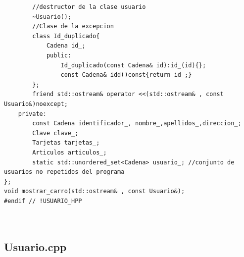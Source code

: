 \begin{verbatim}
        //destructor de la clase usuario
        ~Usuario();
        //Clase de la excepcion
        class Id_duplicado{
            Cadena id_;
            public:
                Id_duplicado(const Cadena& id):id_(id){};
                const Cadena& idd()const{return id_;}
        };
        friend std::ostream& operator <<(std::ostream& , const Usuario&)noexcept;
    private:
        const Cadena identificador_, nombre_,apellidos_,direccion_;
        Clave clave_;
        Tarjetas tarjetas_;
        Articulos articulos_;
        static std::unordered_set<Cadena> usuario_; //conjunto de usuarios no repetidos del programa
};
void mostrar_carro(std::ostream& , const Usuario&);
#endif // !USUARIO_HPP
    
    
\end{verbatim}

\subsection{Usuario.cpp}
